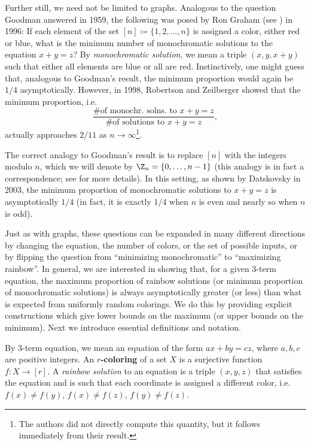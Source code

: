 Further still, we need not be limited to graphs. 
Analogous to the question Goodman answered in 1959, the following was posed by Ron Graham (see \cite{RZ1998}) in 1996:
If each element of the set $[n] \coloneqq \{1, 2, \dots, n\}$ is assigned a color, either red or blue,
what is the minimum number of monochromatic solutions to the equation $x + y = z$?
By \textit{monochromatic solution}, we mean a triple $(x, y, x + y)$ such that either all elements are blue
or all are red.
Instinctively, one might guess that, analogous to Goodman's result, the minimum proportion would again be
$1/4$ asymptotically. However, in 1998, Robertson and Zeilberger \cite{RZ1998} showed that the minimum proportion, i.e.
\[\frac{\text{\# of monochr. solns. to $x + y = z$}}{\text{\# of solutions to $x + y = z$}},\]
actually approaches $2/11$ as $n \to \infty$\footnote{The authors did not
directly compute this quantity, but it follows immediately from their
result.}.

The correct analogy to Goodman's result 
is to replace $[n]$ with the integers modulo $n$, which we will denote by $\Z_n = \{0, \dots, n - 1\}$
(this analogy is in fact a correspondence; see \cite{SW2017} for more details).
In this setting, as shown by Datskovsky \cite{D2003} in 2003, the minimum proportion of monochromatic
solutions to $x + y = z$ is asymptotically $1/4$ (in fact, it is exactly $1/4$ when $n$ is even
and nearly so when $n$ is odd).

Just as with graphs, these questions can be expanded in many different directions by changing the equation,
the number of colors, or the set of possible inputs, or by flipping the question from ``minimizing monochromatic'' 
to ``maximizing rainbow''.
In general, we are interested in showing that, for a given $3$-term equation,
the maximum proportion of rainbow solutions (or minimum proportion of monochromatic solutions) 
is always asymptotically greater (or less) than what is expected from uniformly random colorings.
We do this by providing explicit constructions which give lower bounds on the maximum (or
upper bounds on the minimum).
Next
we introduce essential definitions and notation. 

By 3-term equation, we mean an equation of the form $ax + by = cz$, where $a, b, c$ are positive integers.
An \textbf{$r$-coloring} of a set $X$ is a surjective function $f : X \to [r]$.
A \textit{rainbow solution} to an equation is a triple $(x, y, z)$ that satisfies the equation 
and is such that each coordinate is assigned a different color, 
i.e. $f(x) \neq f(y)$, $f(x) \neq f(z)$, $f(y) \neq f(z)$.

